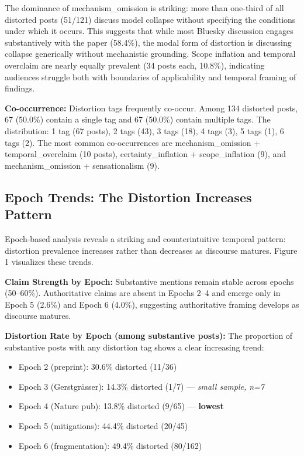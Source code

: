 \documentclass[twocolumn,11pt]{article}
\begin{document}
The dominance of mechanism\_omission is striking: more than one-third of all distorted posts (51/121) discuss model collapse without specifying the conditions under which it occurs. This suggests that while most Bluesky discussion engages substantively with the paper (58.4\%), the modal form of distortion is discussing collapse generically without mechanistic grounding. Scope inflation and temporal overclaim are nearly equally prevalent (34 posts each, 10.8\%), indicating audiences struggle both with boundaries of applicability and temporal framing of findings.

\textbf{Co-occurrence:} Distortion tags frequently co-occur. Among 134 distorted posts, 67 (50.0\%) contain a single tag and 67 (50.0\%) contain multiple tags. The distribution: 1 tag (67 posts), 2 tags (43), 3 tags (18), 4 tags (3), 5 tags (1), 6 tags (2). The most common co-occurrences are mechanism\_omission + temporal\_overclaim (10 posts), certainty\_inflation + scope\_inflation (9), and mechanism\_omission + sensationalism (9).

\subsection{Epoch Trends: The Distortion Increases Pattern}

Epoch-based analysis reveals a striking and counterintuitive temporal pattern: distortion prevalence increases rather than decreases as discourse matures. Figure 1 visualizes these trends.

\textbf{Claim Strength by Epoch:} Substantive mentions remain stable across epochs (50--60\%). Authoritative claims are absent in Epochs 2--4 and emerge only in Epoch 5 (2.6\%) and Epoch 6 (4.0\%), suggesting authoritative framing develops as discourse matures.

\textbf{Distortion Rate by Epoch (among substantive posts):} The proportion of substantive posts with any distortion tag shows a clear increasing trend:
\begin{itemize}
\item Epoch 2 (preprint): 30.6\% distorted (11/36)
\item Epoch 3 (Gerstgrässer): 14.3\% distorted (1/7) — \textit{small sample, n=7}
\item Epoch 4 (Nature pub): 13.8\% distorted (9/65) — \textbf{lowest}
\item Epoch 5 (mitigations): 44.4\% distorted (20/45)
\item Epoch 6 (fragmentation): 49.4\% distorted (80/162)
\end{itemize}
\end{document}
